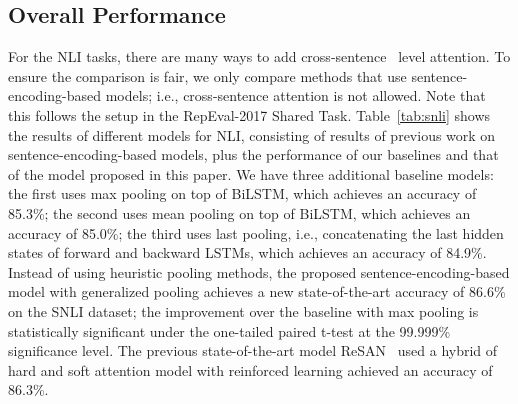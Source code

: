 \documentclass[11pt]{article}
\begin{document}
\subsection{Overall Performance}
For the NLI tasks, there are many ways to add cross-sentence~\cite{DBLP:journals/corr/RocktaschelGHKB15,DBLP:conf/emnlp/ParikhT0U16,DBLP:conf/acl/ChenZLWJI17} level attention. To ensure the comparison is fair, we only compare methods that use sentence-encoding-based models; i.e., cross-sentence attention is not allowed. Note that this follows the setup in the RepEval-2017 Shared Task. Table~\ref{tab:snli} shows the results of different models for NLI, consisting of results of previous work on sentence-encoding-based models, plus the performance of our baselines and that of the model proposed in this paper. We have three additional baseline models: the first uses max pooling on top of BiLSTM, which achieves an accuracy of 85.3\%; the second uses mean pooling on top of BiLSTM, which achieves an accuracy of 85.0\%; the third uses last pooling, i.e., concatenating the last hidden states of forward and backward LSTMs, which achieves an accuracy of 84.9\%. Instead of using heuristic pooling methods, the proposed sentence-encoding-based model with generalized pooling achieves a new state-of-the-art accuracy of 86.6\% on the SNLI dataset; the improvement over the baseline with max pooling is statistically significant under the one-tailed paired t-test at the 99.999\% significance level. The previous state-of-the-art model ReSAN~\cite{DBLP:journals/corr/abs-1801-10296} used a hybrid of hard and soft attention model with reinforced learning achieved an accuracy of 86.3\%.  
\end{document}
